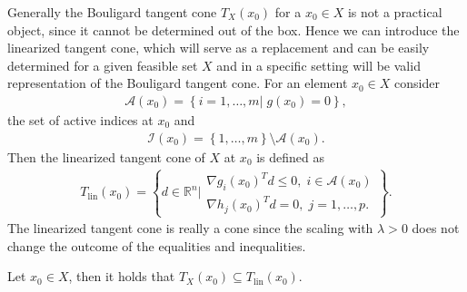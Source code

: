Generally the Bouligard tangent cone $T_X(x_0)$ for a $x_0 \in X$ is not a
practical object, since it cannot be determined out of the box. Hence we can
introduce the linearized tangent cone, which will serve as a replacement and
can be easily determined for a given feasible set $X$ and in a specific
setting will be valid representation of the Bouligard tangent cone. For an
element $x_0 \in X$ consider
\begin{align}
    \mathcal{A}(x_0) = \left\{ i = 1,\ldots,m|\;g(x_0) = 0 \right\},
\end{align}
the set of active indices at $x_0$ and
\begin{align}
    \mathcal{I}(x_0) = \left\{1,\ldots,m \right\}\setminus\mathcal{A}(x_0).
\end{align}
Then the linearized tangent cone of $X$ at $x_0$ is defined as
\begin{align}
    T_{\text{lin} }(x_0) = \left\{
        d\in \mathbb{R}^{n} \Big|
        \begin{array}{l}
            \nabla g_i(x_0)^{T} d \le 0,\; i \in \mathcal{A}(x_0)\\
            \nabla h_j(x_0)^{T} d = 0,\; j=1,\ldots,p.
        \end{array} \right\}.
\end{align}
The linearized tangent cone is really a cone since the scaling with
$\lambda>0$ does not change the outcome of the equalities and inequalities.
\begin{lemma}
    Let $x_{0} \in X$, then it holds that $T_X(x_0) \subseteq
    T_{\text{lin}}(x_0)$.
\end{lemma}
